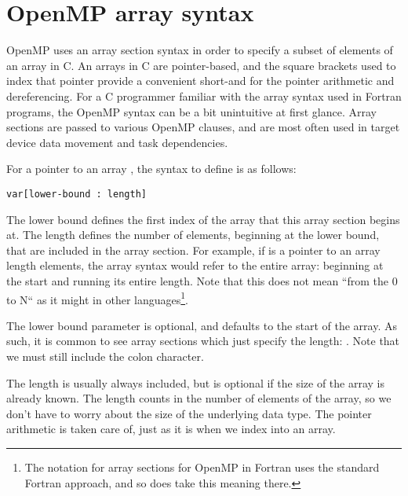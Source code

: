 \section{OpenMP array syntax}
\label{sec:array_syntax}

OpenMP uses an array section syntax in order to specify a subset of elements of an array in C.
An arrays in C are pointer-based, and the square brackets used to index that pointer provide a convenient short-and for the pointer arithmetic and dereferencing.
For a C programmer familiar with the array syntax used in Fortran programs, the OpenMP syntax can be a bit unintuitive at first glance.
Array sections are passed to various OpenMP clauses, and are most often used in target device data movement and task dependencies.

For a pointer to an array , the syntax to define is as follows:
\begin{verbatim}
var[lower-bound : length]
\end{verbatim}
The lower bound defines the first index of the array that this array section begins at.
The length defines the number of elements, beginning at the lower bound, that are included in the array section.
For example, if  is a pointer to an array length  elements, the array syntax  would refer to the entire array: beginning at the start and running its entire length.
Note that this does not mean ``from the 0 to N`` as it might in other languages\footnote{The notation for array sections for OpenMP in Fortran uses the standard Fortran approach, and so does take this meaning there.}.

The lower bound parameter is optional, and defaults to the start of the array. As such, it is common to see array sections which just specify the length: . Note that we must still include the colon character.

The length is usually always included, but is optional if the size of the array is already known.
The length counts in the number of elements of the array, so we don't have to worry about the size of the underlying data type. The pointer arithmetic is taken care of, just as it is when we index into an array.

